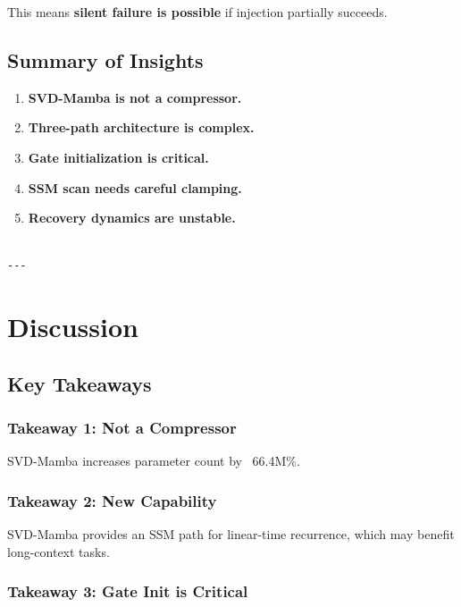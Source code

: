 This means \textbf{silent failure is possible} if injection partially succeeds.

\subsection{Summary of Insights}

\begin{enumerate}
\item \textbf{SVD-Mamba is not a compressor.}
\item \textbf{Three-path architecture is complex.}
\item \textbf{Gate initialization is critical.}
\item \textbf{SSM scan needs careful clamping.}
\item \textbf{Recovery dynamics are unstable.}
\end{enumerate}
\begin{lstlisting}

---
\end{lstlisting}


\section{Discussion}

\subsection{Key Takeaways}

\subsubsection{Takeaway 1: Not a Compressor}

SVD-Mamba increases parameter count by ~66.4M\%.

\subsubsection{Takeaway 2: New Capability}

SVD-Mamba provides an SSM path for linear-time recurrence, which may 
benefit long-context tasks.

\subsubsection{Takeaway 3: Gate Init is Critical}

